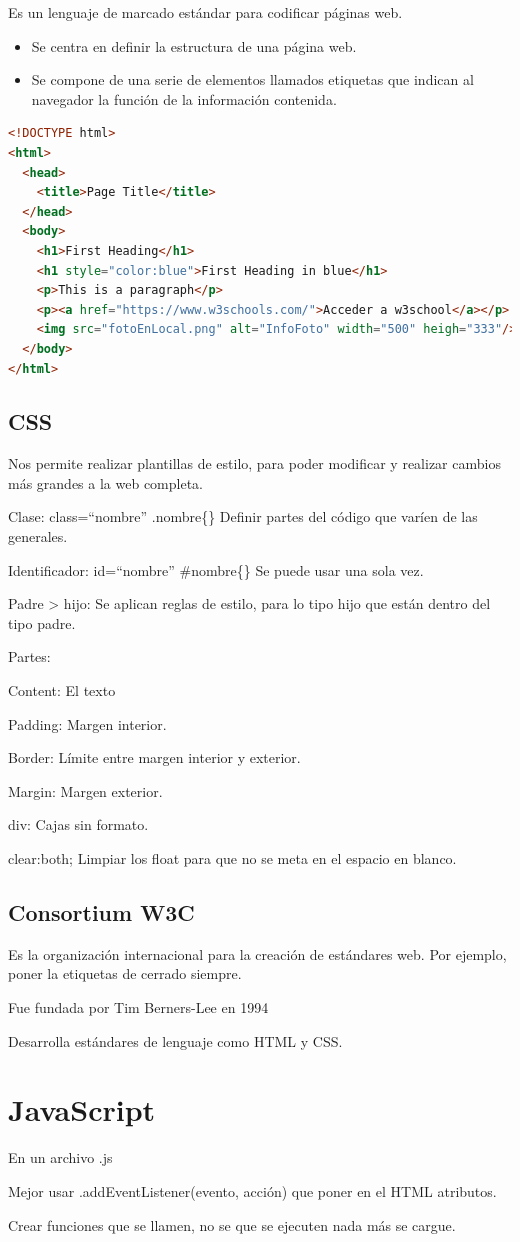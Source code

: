 \documentclass[12pt, twoside, openright]{report} %
\begin{document}
Es un lenguaje de marcado estándar para codificar páginas web.

\begin{itemize}
	\item Se centra en definir la estructura de una página web.
	\item Se compone de una serie de elementos llamados etiquetas que indican
	      al navegador la función de la información contenida.
\end{itemize}
\pagebreak
\begin{lstlisting}[language=HTML]
<!DOCTYPE html>
<html>
  <head>
    <title>Page Title</title>
  </head>
  <body>
    <h1>First Heading</h1>
    <h1 style="color:blue">First Heading in blue</h1>
    <p>This is a paragraph</p>
    <p><a href="https://www.w3schools.com/">Acceder a w3school</a></p>
    <img src="fotoEnLocal.png" alt="InfoFoto" width="500" heigh="333"/>
  </body>
</html>
\end{lstlisting}

\section{CSS}

Nos permite realizar plantillas de estilo, para poder modificar y
realizar cambios más grandes a la web completa.

Clase: class=``nombre'' .nombre\{\} Definir partes del código que
varíen de las generales.

Identificador: id=``nombre'' \#nombre\{\} Se puede usar una sola vez.

Padre \textgreater{} hijo: Se aplican reglas de estilo, para lo tipo
hijo que están dentro del tipo padre.

Partes:

Content: El texto

Padding: Margen interior.

Border: Límite entre margen interior y exterior.

Margin: Margen exterior.

div: Cajas sin formato.

clear:both; Limpiar los float para que no se meta en el espacio en
blanco.

\section{Consortium W3C}

Es la organización internacional para la creación de estándares web.
Por ejemplo, poner la etiquetas de cerrado siempre.

Fue fundada por Tim Berners-Lee en 1994

Desarrolla estándares de lenguaje como HTML y CSS.

\chapter{JavaScript}

En un archivo .js

Mejor usar .addEventListener(evento, acción) que poner en el HTML
atributos.

Crear funciones que se llamen, no se que se ejecuten nada más se
cargue.
\end{document}
